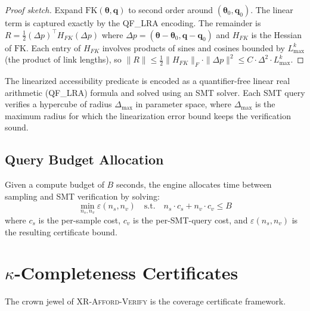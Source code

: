 \documentclass[11pt,letterpaper]{article}
\newcommand{\tool}{\textsc{XR-Afford-Verify}}
\newcommand{\FK}{\mathrm{FK}}
\newcommand{\eps}{\varepsilon}
\newcommand{\bodyp}{\boldsymbol{\theta}}
\newcommand{\joint}{\mathbf{q}}
\begin{document}
\begin{proof}[Proof sketch]
Expand $\FK(\bodyp, \joint)$ to second order around $(\bodyp_0, \joint_0)$.
The linear term is captured exactly by the QF\_LRA encoding.
The remainder is $R = \frac{1}{2} (\Delta p)^\top H_{FK} (\Delta p)$ where $\Delta p = (\bodyp - \bodyp_0, \joint - \joint_0)$ and $H_{FK}$ is the Hessian of $\FK$.
Each entry of $H_{FK}$ involves products of sines and cosines bounded by $L_{\max}^k$ (the product of link lengths), so $\|R\| \leq \frac{1}{2}\|H_{FK}\|_F \cdot \|\Delta p\|^2 \leq C \cdot \Delta^2 \cdot L_{\max}^k$.
\end{proof}

The linearized accessibility predicate is encoded as a quantifier-free linear real arithmetic (QF\_LRA) formula and solved using an SMT solver.
Each SMT query verifies a hypercube of radius $\Delta_{\max}$ in parameter space, where $\Delta_{\max}$ is the maximum radius for which the linearization error bound keeps the verification sound.

\subsection{Query Budget Allocation}

Given a compute budget of $B$ seconds, the engine allocates time between sampling and SMT verification by solving:
\begin{equation}
\min_{n_s, n_v} \eps(n_s, n_v) \quad \text{s.t.} \quad n_s \cdot c_s + n_v \cdot c_v \leq B
\end{equation}
where $c_s$ is the per-sample cost, $c_v$ is the per-SMT-query cost, and $\eps(n_s, n_v)$ is the resulting certificate bound.

\section{$\kappa$-Completeness Certificates}
\label{sec:certificates}

The crown jewel of \tool{} is the coverage certificate framework.
\end{document}
